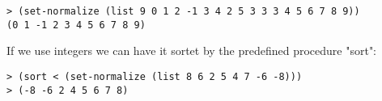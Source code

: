 \begin{verbatim}
> (set-normalize (list 9 0 1 2 -1 3 4 2 5 3 3 3 4 5 6 7 8 9))
(0 1 -1 2 3 4 5 6 7 8 9)
\end{verbatim}

If we use integers we can have it sortet by the predefined procedure "sort":

\begin{verbatim}
> (sort < (set-normalize (list 8 6 2 5 4 7 -6 -8)))
> (-8 -6 2 4 5 6 7 8)
\end{verbatim}